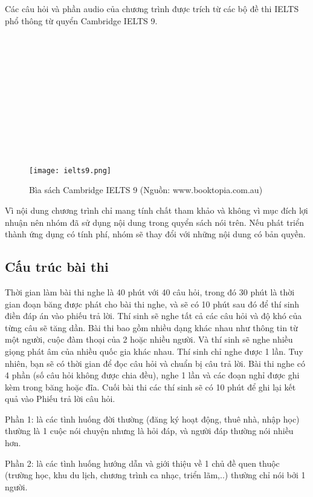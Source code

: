 Các câu hỏi và phần audio của chương trình được trích từ các bộ đề thi IELTS phổ thông từ quyển Cambridge IELTS 9.\\
\\
\\
\\
\\
\\
\\
\\
\\
\\
\\
\\
\begin{figure}[!htb] 
\centering
\texttt{[image: ielts9.png]}
\caption{Bìa sách Cambridge IELTS 9 (Nguồn: www.booktopia.com.au)}
\end{figure}

Vì nội dung chương trình chỉ mang tính chất tham khảo và không vì mục đích lợi nhuận nên nhóm đã sử dụng nội dung trong quyển sách nói trên. Nếu phát triển thành ứng dụng có tính phí, nhóm sẽ thay đổi với những nội dung có bản quyền.

\subsection{Cấu trúc bài thi}

Thời gian làm bài thi nghe là 40 phút với 40 câu hỏi, trong đó 30 phút là thời gian đoạn băng được phát cho bài thi nghe, và sẽ có 10 phút sau đó để thí sinh điền đáp án vào phiếu trả lời. Thí sinh sẽ nghe tất cả các câu hỏi và độ khó của từng câu sẽ tăng dần. Bài thi bao gồm nhiều dạng khác nhau như thông tin từ một người, cuộc đàm thoại của 2 hoặc nhiều người. Và thí sinh sẽ nghe nhiều giọng phát âm của nhiều quốc gia khác nhau. Thí sinh chỉ nghe được 1 lần. Tuy nhiên, bạn sẽ có thời gian để đọc câu hỏi và chuẩn bị câu trả lời. Bài thi nghe có 4 phần (số câu hỏi không được chia đều), nghe 1 lần và các đoạn nghỉ được ghi kèm trong băng hoặc đĩa. Cuối bài thi các thí sinh sẽ có 10 phút để ghi lại kết quả vào Phiếu trả lời câu hỏi.

\quad Phần 1: là các tình huống đời thường (đăng ký hoạt động, thuê nhà, nhập học) thường là 1 cuộc nói chuyện nhưng là hỏi đáp, và người đáp thường nói nhiều hơn.

\quad Phần 2: là các tình huống hướng dẫn và giới thiệu về 1 chủ đề quen thuộc (trường học, khu du lịch, chương trình ca nhạc, triển lãm,..) thường chỉ nói bởi 1 người.

